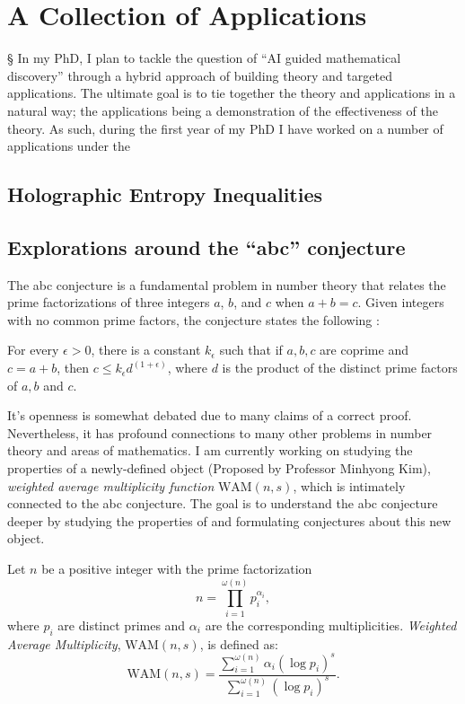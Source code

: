 \chapter{A Collection of Applications}
\label{chap:applications}§
In my PhD, I plan to tackle the question of ``AI guided mathematical discovery'' through a hybrid approach of building theory and targeted applications. The ultimate goal is to tie together the theory and applications in a natural way; the applications being a demonstration of the effectiveness of the theory. As such, during the first year of my PhD I have worked on a number
of applications under the 
\section{Holographic Entropy Inequalities}

\section{Explorations around the ``abc'' conjecture}
\label{sec:abc-conjecture}
The abc conjecture is a fundamental problem in number theory that relates the prime factorizations of three integers $a$, $b$, and $c$ when $a + b = c$. Given integers with no common prime factors, the conjecture states the following \cite{masser1985open}:
\begin{conjecture}
    \label{abc}
    For every $\epsilon > 0$, there is a constant $k_\epsilon$ such that if $a,b,c$ are coprime and $c = a + b$, then $c\leq k_\epsilon d^{(1 + \epsilon)}$, where $d$ is the product of the distinct prime factors of $a, b$ and $c$.
\end{conjecture}
It's openness is somewhat debated due to many claims of a correct proof. Nevertheless, it has profound connections to many other problems in number theory and areas of mathematics. I am currently working on studying the properties of a newly-defined object (Proposed by Professor Minhyong Kim), \emph{weighted average multiplicity function} $\text{WAM}(n, s)$,
which is intimately connected to the abc conjecture. The goal is to understand the abc conjecture deeper by studying the properties of and formulating conjectures about this new object.

\begin{definition}
    Let $n$ be a positive integer with the prime factorization 
    \[
    n = \prod_{i=1}^{\omega(n)} p_i^{\alpha_i},
    \]
    where $p_i$ are distinct primes and $\alpha_i$ are the corresponding multiplicities.
    \emph{Weighted Average Multiplicity}, $\text{WAM}(n, s)$, is defined as:
    \[
    \text{WAM}(n, s) = \frac{\sum_{i=1}^{\omega(n)} \alpha_i (\log p_i)^s}{\sum_{i=1}^{\omega(n)} (\log p_i)^s}.
    \]
\end{definition}

